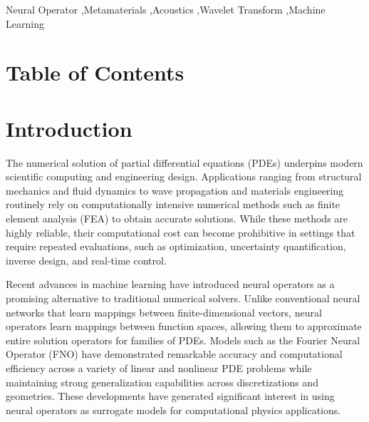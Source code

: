 \documentclass[preprint,review,12pt]{elsarticle}
\begin{document}
\begin{frontmatter}
\begin{keyword}
Neural Operator \sep Metamaterials \sep Acoustics \sep Wavelet Transform \sep Machine Learning


\end{keyword}

\end{frontmatter}



\section*{Table of Contents}
\begingroup
  \renewcommand{\contentsname}{}
  \tableofcontents
\endgroup
\pagebreak
\section{Introduction}
\label{introduction}

The numerical solution of partial differential equations (PDEs) underpins modern scientific computing and engineering design. Applications ranging from structural mechanics and fluid dynamics to wave propagation and materials engineering routinely rely on computationally intensive numerical methods such as finite element analysis (FEA) to obtain accurate solutions. While these methods are highly reliable, their computational cost can become prohibitive in settings that require repeated evaluations, such as optimization, uncertainty quantification, inverse design, and real-time control. 

Recent advances in machine learning have introduced neural operators as a promising alternative to traditional numerical solvers. Unlike conventional neural networks that learn mappings between finite-dimensional vectors, neural operators learn mappings between function spaces, allowing them to approximate entire solution operators for families of PDEs. Models such as the Fourier Neural Operator (FNO) have demonstrated remarkable accuracy and computational efficiency across a variety of linear and nonlinear PDE problems while maintaining strong generalization capabilities across discretizations and geometries.  These developments have generated significant interest in using neural operators as surrogate models for computational physics applications. 
\end{document}
